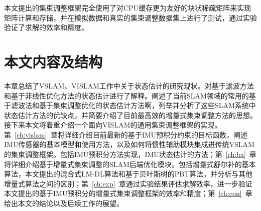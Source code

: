 本文提出的集束调整框架完全使用了对CPU缓存更为友好的块状稀疏矩阵来实现矩阵计算和存储，并在模拟数据和真实的集束调整数据集上进行了测试，通过实验验证了求解的效率和精度。




\section{本文内容及结构}

本章总结了VSLAM、VISLAM工作中关于状态估计的研究现状。对基于滤波方法和基于非线性优化方法的状态估计进行了解释。阐述了当前SLAM领域的常用的基于滤波法和基于集束调整优化的状态估计方法啊，列举并分析了这些SLAM系统中状态估计方法的优缺点，并简要介绍了目前最高效的增量式集束调整方法的思想。接下来本文将着重介绍一个面向VISLAM的通用集束调整框架的实现。第~\ref{ch:vislam}~章将详细介绍目前最新的基于IMU预积分约束的目标函数，阐述IMU传感器的基本模型和使用方法，以及如何将惯性辅助模块集成进传统VSLAM的集束调整框架。包括IMU预积分方法实现，IMU状态估计的方法；第~\ref{ch:ba}~章将详细介绍基于增量式集束调整的SLAM后端优化模块。包括增量式舒尔补的基本算法，本文提出的混合式LM-DL算法和基于贝叶斯树的PBT算法，并分析与其他增量式算法之间的区别；第~\ref{ch:exp}~章通过实验结果评估求解效率，进一步验证本文提出的基于IMU预积分的增量式集束调整框架的效率和精度；第~\ref{ch:con}~章给出本文的结论以及后续工作的展望。
